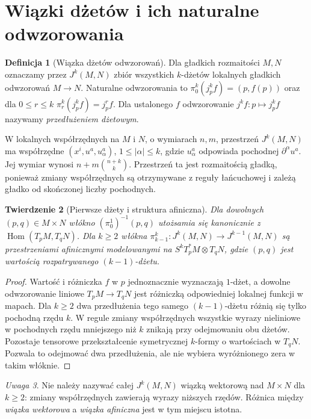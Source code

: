 \documentclass[11pt,a4paper,oneside]{book}
\numberwithin{equation}{chapter}
\theoremstyle{plain}
\newtheorem{twierdzenie}{Twierdzenie}[chapter]
\theoremstyle{definition}
\newtheorem{definicja}[twierdzenie]{Definicja}
\theoremstyle{remark}
\newtheorem{uwaga}[twierdzenie]{Uwaga}
\begin{document}
\section{Wiązki dżetów i ich naturalne odwzorowania}
\begin{definicja}[Wiązka dżetów odwzorowań]
\label{def:dzety-bundle}
Dla gładkich rozmaitości $M,N$ oznaczamy przez $J^k(M,N)$
zbiór wszystkich $k$-dżetów lokalnych gładkich odwzorowań
$M\to N$. Naturalne odwzorowania to
$\pi_0^k(j_p^k f)=(p,f(p))$ oraz dla $0\le r\le k$
$\pi_r^k(j_p^k f)=j_p^r f$.
Dla ustalonego $f$ odwzorowanie $j^kf:p\mapsto j_p^kf$
nazywamy \emph{przedłużeniem dżetowym}.
\end{definicja}

W lokalnych współrzędnych na $M$ i $N$, o wymiarach $n,m$,
przestrzeń $J^k(M,N)$ ma współrzędne $(x^i,u^a,u^a_\alpha)$,
$1\le|\alpha|\le k$, gdzie $u^a_\alpha$ odpowiada pochodnej
$\partial^\alpha u^a$. Jej wymiar wynosi
$n+m\binom{n+k}{k}$. Przestrzeń ta jest rozmaitością gładką,
ponieważ zmiany współrzędnych są otrzymywane z reguły
łańcuchowej i zależą gładko od skończonej liczby pochodnych.

\begin{twierdzenie}[Pierwsze dżety i struktura afiniczna]
\label{thm:dzety-affine}
Dla dowolnych $(p,q)\in M\times N$ włókno
$(\pi_0^1)^{-1}(p,q)$ utożsamia się kanonicznie z
$\operatorname{Hom}(T_pM,T_qN)$. Dla $k\ge2$ włókna
$\pi_{k-1}^k:J^k(M,N)\to J^{k-1}(M,N)$ są przestrzeniami
afinicznymi modelowanymi na
$S^kT_p^*M\otimes T_qN$, gdzie $(p,q)$ jest
wartością rozpatrywanego $(k-1)$-dżetu.
\end{twierdzenie}
\begin{proof}
Wartość i różniczka $f$ w $p$ jednoznacznie wyznaczają
$1$-dżet, a dowolne odwzorowanie liniowe
$T_pM\to T_qN$ jest różniczką odpowiedniej lokalnej funkcji
w mapach. Dla $k\ge2$ dwa przedłużenia tego samego
$(k-1)$-dżetu różnią się tylko pochodną rzędu $k$.
W regule zmiany współrzędnych wszystkie wyrazy
nieliniowe w pochodnych rzędu mniejszego niż $k$ znikają
przy odejmowaniu obu dżetów. Pozostaje tensorowe
przekształcenie symetrycznej $k$-formy o wartościach
w $T_qN$. Pozwala to odejmować dwa przedłużenia,
ale nie wybiera wyróżnionego zera w takim włóknie.
\end{proof}

\begin{uwaga}
Nie należy nazywać całej $J^k(M,N)$ wiązką wektorową
nad $M\times N$ dla $k\ge2$: zmiany współrzędnych
zawierają wyrazy niższych rzędów. Różnica między
\emph{wiązka wektorowa} a \emph{wiązka afiniczna}
jest w tym miejscu istotna.
\end{uwaga}
\end{document}
